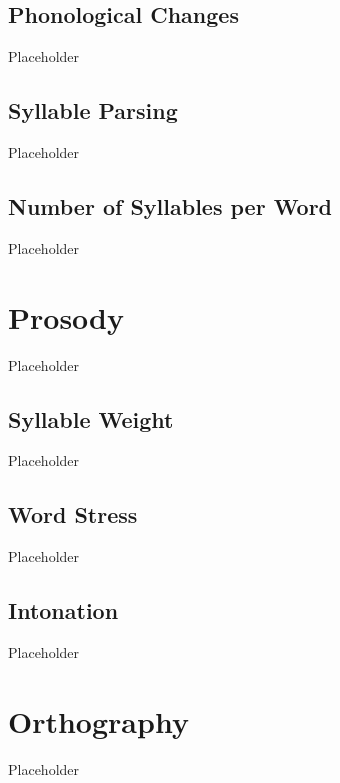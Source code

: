 \subsection{Phonological Changes}
\label{subsec:tvk-phone-changes}

Placeholder

\subsection{Syllable Parsing}
\label{subsec:tvk-syll-parse}

Placeholder

\subsection{Number of Syllables per Word}
\label{subsec:tvk-num-syll}

Placeholder

\section{Prosody}
\label{sec:tvk-prosody}

Placeholder

\subsection{Syllable Weight}
\label{subsec:tvk-syll-weight}

Placeholder

\subsection{Word Stress}
\label{subsec:tvk-word-stress}

Placeholder

\subsection{Intonation}
\label{subsec:tvk-intonation}

Placeholder

\section{Orthography}
\label{sec:tvk-orthography}

Placeholder